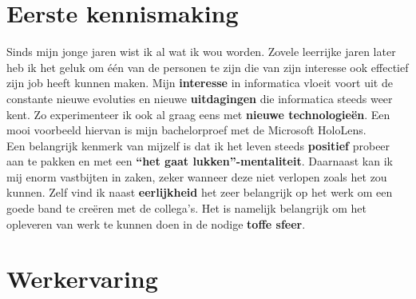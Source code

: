 \documentclass[lightTheme]{cv}
\begin{document}
\begin{paracol}{2}
{\bigskip

}
\switchcolumn

\small

\section*{Eerste kennismaking}

Sinds mijn jonge jaren wist ik al wat ik wou worden. Zovele leerrijke jaren later heb ik het geluk om één van de personen te zijn die van zijn interesse ook effectief zijn job heeft kunnen maken. Mijn \textbf{interesse} in informatica vloeit voort uit de constante nieuwe evoluties en nieuwe \textbf{uitdagingen} die informatica steeds weer kent. Zo experimenteer ik ook al graag eens met \textbf{nieuwe technologieën}. Een mooi voorbeeld hiervan is mijn bachelorproef met de Microsoft HoloLens. \\

Een belangrijk kenmerk van mijzelf is dat ik het leven steeds \textbf{positief} probeer aan te pakken en met een \textbf{“het gaat lukken”-mentaliteit}. Daarnaast kan ik mij enorm vastbijten in zaken, zeker wanneer deze niet verlopen zoals het zou kunnen. Zelf vind ik naast \textbf{eerlijkheid} het zeer belangrijk op het werk om een goede band te creëren met de collega’s. Het is namelijk belangrijk om het opleveren van werk te kunnen doen in de nodige \textbf{toffe sfeer}.

\section*{Werkervaring}


\end{paracol}
\end{document}
